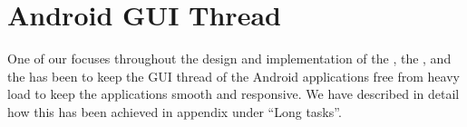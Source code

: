 
\section{Android GUI Thread}
\label{sec:gui_thread_async_task}

One of our focuses throughout the design and implementation of the \launcher, the \ct, and the \gc has been to keep the GUI thread of the Android applications free from heavy load to keep the applications smooth and responsive. We have described in detail how this has been achieved in appendix  under ``Long tasks''.

 

